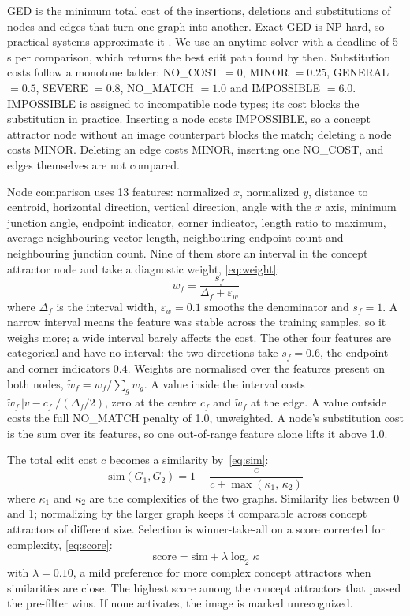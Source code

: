 GED is the minimum total cost of the insertions, deletions and substitutions of nodes and edges that turn one graph into another. Exact GED is NP-hard, so practical systems approximate it \cite{riesen2009}. We use an anytime solver with a deadline of 5 s per comparison, which returns the best edit path found by then. Substitution costs follow a monotone ladder: NO\_COST $= 0$, MINOR $= 0.25$, GENERAL $= 0.5$, SEVERE $= 0.8$, NO\_MATCH $= 1.0$ and IMPOSSIBLE $= 6.0$. IMPOSSIBLE is assigned to incompatible node types; its cost blocks the substitution in practice. Inserting a node costs IMPOSSIBLE, so a concept attractor node without an image counterpart blocks the match; deleting a node costs MINOR. Deleting an edge costs MINOR, inserting one NO\_COST, and edges themselves are not compared.

Node comparison uses 13 features: normalized $x$, normalized $y$, distance to centroid, horizontal direction, vertical direction, angle with the $x$ axis, minimum junction angle, endpoint indicator, corner indicator, length ratio to maximum, average neighbouring vector length, neighbouring endpoint count and neighbouring junction count. Nine of them store an interval in the concept attractor node and take a diagnostic weight, \eqref{eq:weight}:
\begin{equation}\label{eq:weight}
w_f = \frac{s_f}{\Delta_f + \varepsilon_w}
\end{equation}
where $\Delta_f$ is the interval width, $\varepsilon_w = 0.1$ smooths the denominator and $s_f = 1$. A narrow interval means the feature was stable across the training samples, so it weighs more; a wide interval barely affects the cost. The other four features are categorical and have no interval: the two directions take $s_f = 0.6$, the endpoint and corner indicators $0.4$. Weights are normalised over the features present on both nodes, $\tilde w_f = w_f / \sum_g w_g$. A value inside the interval costs $\tilde w_f\,|v - c_f| / (\Delta_f / 2)$, zero at the centre $c_f$ and $\tilde w_f$ at the edge. A value outside costs the full NO\_MATCH penalty of 1.0, unweighted. A node's substitution cost is the sum over its features, so one out-of-range feature alone lifts it above 1.0.

The total edit cost $c$ becomes a similarity by~\eqref{eq:sim}:
\begin{equation}\label{eq:sim}
\mathrm{sim}(G_1, G_2) = 1 - \frac{c}{c + \max(\kappa_1,\, \kappa_2)}
\end{equation}
where $\kappa_1$ and $\kappa_2$ are the complexities of the two graphs. Similarity lies between 0 and 1; normalizing by the larger graph keeps it comparable across concept attractors of different size. Selection is winner-take-all on a score corrected for complexity, \eqref{eq:score}:
\begin{equation}\label{eq:score}
\mathrm{score} = \mathrm{sim} + \lambda \log_2 \kappa
\end{equation}
with $\lambda = 0.10$, a mild preference for more complex concept attractors when similarities are close. The highest score among the concept attractors that passed the pre-filter wins. If none activates, the image is marked unrecognized.
